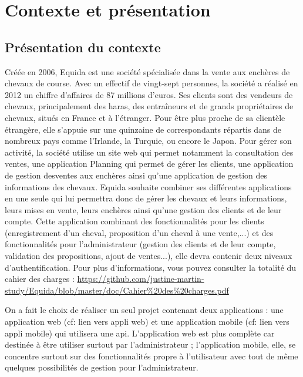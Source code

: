 \chapter{Contexte et présentation}
	\section{Présentation du contexte}
		Créée en 2006, Equida est une société spécialisée dans la vente aux enchères de chevaux de course. Avec un effectif de vingt-sept personnes, la société a réalisé en 2012 un chiffre d’affaires de 87 millions d’euros. Ses clients sont des vendeurs de chevaux, principalement des haras, des entraîneurs et de grands propriétaires de chevaux, situés en France et à l’étranger. Pour être plus proche de sa clientèle étrangère, elle s’appuie sur une quinzaine de correspondants répartis dans de nombreux pays comme l’Irlande, la Turquie, ou encore le Japon.\newline
		Pour gérer son activité, la société utilise un site web qui permet notamment la consultation des ventes, une application Planning qui permet de gérer les clients, une application de gestion desventes aux enchères ainsi qu'une application de gestion des informations des chevaux.\newline
		Equida souhaite combiner ses différentes applications en une seule qui lui permettra donc de gérer les chevaux et leurs informations, leurs mises en vente, leurs enchères ainsi qu'une gestion des clients et de leur compte. Cette application combinant des fonctionnalités pour les clients (enregistrement d'un cheval, proposition d'un cheval à une vente,...) et des fonctionnalités pour l'administrateur (gestion des clients et de leur compte, validation des propositions, ajout de ventes...), elle devra contenir deux niveaux d'authentification.
		Pour plus d'informations, vous pouvez consulter la totalité du cahier des charges : \url{https://github.com/justine-martin-study/Equida/blob/master/doc/Cahier%20des%20charges.pdf}

		\noindent
		On a fait le choix de réaliser un seul projet contenant deux applications : une application web (cf: lien vers appli web) et une application mobile (cf: lien vers appli mobile) qui utilisera une api. L'application web est plus complète car destinée à être utiliser surtout par l'administrateur ; l'application mobile, elle, se concentre surtout sur des fonctionnalités propre à l'utilisateur avec tout de même quelques possibilités de gestion pour l'administrateur.

